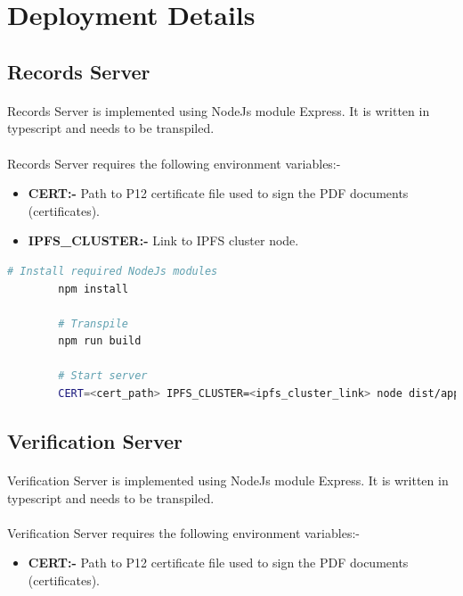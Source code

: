\documentclass{article}
\begin{document}
        


\section{Deployment Details}
    \subsection{Records Server}
        \paragraph{}
        Records Server is implemented using NodeJs module Express. It is written in typescript and needs to be transpiled.
        
        \paragraph{}
        Records Server requires the following environment variables:-
        \begin{itemize}
            \item \textbf{CERT:-} Path to P12 certificate file used to sign the PDF documents (certificates).
            \item \textbf{IPFS\_CLUSTER:-} Link to IPFS cluster node.
        \end{itemize}
        
        \begin{lstlisting}[language=bash, caption=Records Server]
        # Install required NodeJs modules
        npm install
    
        # Transpile
        npm run build
    
        # Start server
        CERT=<cert_path> IPFS_CLUSTER=<ipfs_cluster_link> node dist/app.js
        \end{lstlisting}
    
    \subsection{Verification Server}
        \paragraph{}
        Verification Server is implemented using NodeJs module Express. It is written in typescript and needs to be transpiled.
        
        \paragraph{}
        Verification Server requires the following environment variables:-
        \begin{itemize}
            \item \textbf{CERT:-} Path to P12 certificate file used to sign the PDF documents (certificates).
        \end{itemize}
    
\end{document}
